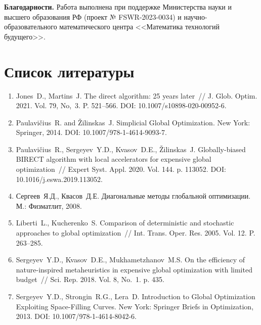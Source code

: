 \documentclass[a4paper,12pt,russian]{article}
\begin{document}
\textbf{Благодарности.} Работа выполнена при поддержке Министерства науки и высшего образования РФ (проект № FSWR-2023-0034) и научно-образовательного математического центра <<Математика технологий будущего>>.


\section*{Список литературы}
\begin{enumerate}

\item \label{rfa:rulit:Jones2021}
Jones~D., Martins~J. The direct algorithm: 25 years later~// J. Glob. Optim. 2021. Vol. 79, No,~3. P. 521--566. DOI: 10.1007/s10898-020-00952-6.

\item \label{rfa:rulit:PaulaviciusZilinskas2014}
Paulavi{\v c}ius~R. and {\v Z}ilinskas~J. Simplicial Global Optimization. New York: Springer, 2014. DOI: 10.1007/978-1-4614-9093-7.

\item \label{rfa:rulit:Birect2020}
Paulavi{\v c}ius~R., Sergeyev~Y.D., Kvasov~D.E., {\v Z}ilinskas~J. Globally-biased {BIRECT} algorithm with local accelerators for expensive global optimization~// 
Expert Syst. Appl. 2020. Vol. 144. p. 113052. DOI: 10.1016/j.eswa.2019.113052.

\item \label{rfa:rulit:Sergeyev2017}
Сергеев~Я.Д., Квасов~Д.Е. Диагональные методы глобальной оптимизации.  М.: Физматлит, 2008. 

\item \label{rfa:rulit:Liberti2005}
Liberti~L., Kucherenko~S. Comparison of deterministic and stochastic approaches to global optimization~// Int. Trans. Oper. Res. 2005. Vol. 12. P. 263--285.

\item \label{rfa:rulit:Sergeyev2018}
Sergeyev~Y.D., Kvasov~D.E., Mukhametzhanov~M.S. On the efficiency of nature-inspired metaheuristics in expensive global optimization with limited budget~// Sci. Rep. 2018. Vol. 8, No.~1. p. 435.

\item \label{rfa:rulit:Sergeyev2013}
Sergeyev~Y.D., Strongin~R.G., Lera~D. Introduction to Global Optimization Exploiting Space-Filling Curves. New York: Springer Briefs in Optimization, 2013. DOI: 10.1007/978-1-4614-8042-6.


\end{enumerate}
\end{document}
